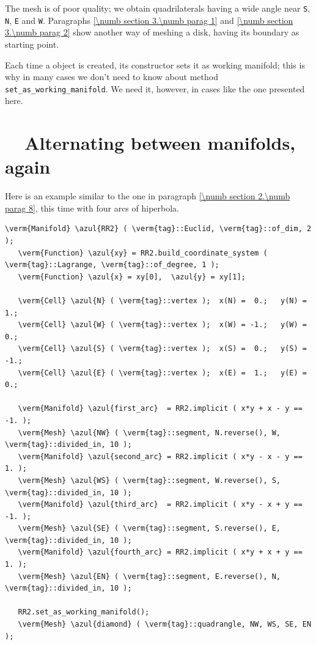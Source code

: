The mesh is of poor quality; we obtain quadrilaterals having a wide angle near {\small\tt S},
{\small\tt N}, {\small\tt E} and {\small\tt W}.
Paragraphs \ref{\numb section 3.\numb parag 1} and \ref{\numb section 3.\numb parag 2} show
another way of meshing a disk, having its boundary as starting point.

Each time a {\small\tt {}} object is created, its constructor sets it as working manifold;
this is why in many cases we don't need to know about method
{\small\tt set\_as\_working\_manifold}.
We need it, however, in cases like the one presented here.


\section{~~Alternating between manifolds, again}\label{\numb section 2.\numb parag 9}

Here is an example similar to the one in paragraph \ref{\numb section 2.\numb parag 8},
this time with four arcs of hiperbola.

\begin{Verbatim}[commandchars=\\\{\},formatcom=\small\tt,frame=single,
   label=main-\ref{\numb section 2.\numb parag 9}.cpp,rulecolor=\color{coment},
   baselinestretch=0.94,framesep=2mm]
   \verm{Manifold} \azul{RR2} ( \verm{tag}::Euclid, \verm{tag}::of_dim, 2 );
   \verm{Function} \azul{xy} = RR2.build_coordinate_system ( \verm{tag}::Lagrange, \verm{tag}::of_degree, 1 );
   \verm{Function} \azul{x} = xy[0],  \azul{y} = xy[1];

   \verm{Cell} \azul{N} ( \verm{tag}::vertex );  x(N) =  0.;   y(N) =  1.;
   \verm{Cell} \azul{W} ( \verm{tag}::vertex );  x(W) = -1.;   y(W) =  0.;
   \verm{Cell} \azul{S} ( \verm{tag}::vertex );  x(S) =  0.;   y(S) = -1.;
   \verm{Cell} \azul{E} ( \verm{tag}::vertex );  x(E) =  1.;   y(E) =  0.;

   \verm{Manifold} \azul{first_arc}  = RR2.implicit ( x*y + x - y == -1. );
   \verm{Mesh} \azul{NW} ( \verm{tag}::segment, N.reverse(), W, \verm{tag}::divided_in, 10 );
   \verm{Manifold} \azul{second_arc} = RR2.implicit ( x*y - x - y ==  1. );
   \verm{Mesh} \azul{WS} ( \verm{tag}::segment, W.reverse(), S, \verm{tag}::divided_in, 10 );
   \verm{Manifold} \azul{third_arc}  = RR2.implicit ( x*y - x + y == -1. );
   \verm{Mesh} \azul{SE} ( \verm{tag}::segment, S.reverse(), E, \verm{tag}::divided_in, 10 );
   \verm{Manifold} \azul{fourth_arc} = RR2.implicit ( x*y + x + y ==  1. );
   \verm{Mesh} \azul{EN} ( \verm{tag}::segment, E.reverse(), N, \verm{tag}::divided_in, 10 );
   
   RR2.set_as_working_manifold();
   \verm{Mesh} \azul{diamond} ( \verm{tag}::quadrangle, NW, WS, SE, EN );
\end{Verbatim}

